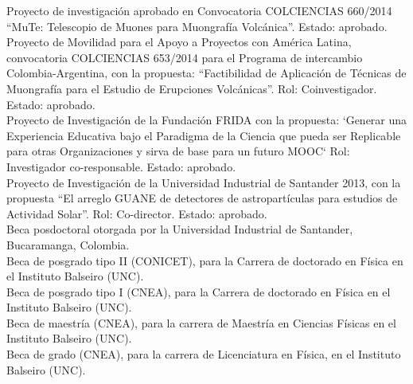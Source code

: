  Proyecto de investigación aprobado en Convocatoria COLCIENCIAS 660/2014 ``MuTe: Telescopio de Muones para Muongrafía Volcánica''. Estado: aprobado.\\
 Proyecto de Movilidad para el Apoyo a Proyectos con América Latina, convocatoria COLCIENCIAS 653/2014 para el Programa de intercambio Colombia-Argentina, con la propuesta: ``Factibilidad de Aplicación de Técnicas de Muongrafía para el Estudio de Erupciones Volcánicas''. Rol: Coinvestigador. Estado: aprobado.\\
 Proyecto de Investigación de la Fundación FRIDA con la propuesta: `Generar una Experiencia Educativa bajo el Paradigma de la Ciencia que pueda ser Replicable para otras Organizaciones y sirva de base para un futuro MOOC` Rol: Investigador co-responsable. Estado: aprobado.\\
 Proyecto de Investigación de la Universidad Industrial de Santander 2013, con la propuesta ``El arreglo GUANE de detectores de astropartículas para estudios de Actividad Solar''. Rol: Co-director. Estado: aprobado.\\
 Beca posdoctoral otorgada por la Universidad Industrial de Santander, Bucaramanga, Colombia.\\
 Beca de posgrado tipo II (CONICET), para la Carrera de doctorado en Física en el Instituto Balseiro (UNC).\\
 Beca de posgrado tipo I (CNEA), para la Carrera de doctorado en Física en el Instituto Balseiro (UNC).\\
 Beca de maestría (CNEA), para la carrera de Maestría en Ciencias Físicas en el Instituto Balseiro (UNC).\\
 Beca de grado (CNEA), para la carrera de Licenciatura en Física, en el Instituto Balseiro (UNC).\\
\fi
\fi
